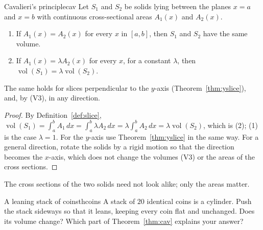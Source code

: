 \documentclass[11pt]{article}
\begin{document}
\begin{thm}{Cavalieri's principle}{cav}
Let $S_1$ and $S_2$ be solids lying between the planes $x=a$ and $x=b$ with continuous cross-sectional areas $A_1(x)$ and $A_2(x)$.
\begin{enumerate}[label=(\arabic*),nosep]
  \item If $A_1(x)=A_2(x)$ for every $x$ in $[a,b]$, then $S_1$ and $S_2$ have the same volume.
  \item If $A_1(x)=\lambda A_2(x)$ for every $x$, for a constant $\lambda$, then $\operatorname{vol}(S_1)=\lambda\operatorname{vol}(S_2)$.
\end{enumerate}
The same holds for slices perpendicular to the $y$-axis (Theorem~\ref{thm:yslice}), and, by (V3), in any direction.
\end{thm}
\begin{proof}
By Definition~\ref{def:slice}, $\operatorname{vol}(S_1)=\int_a^bA_1\,dx=\int_a^b\lambda A_2\,dx=\lambda\int_a^bA_2\,dx=\lambda\operatorname{vol}(S_2)$, which is (2); (1) is the case $\lambda=1$. For the $y$-axis use Theorem~\ref{thm:yslice} in the same way. For a general direction, rotate the solids by a rigid motion so that the direction becomes the $x$-axis, which does not change the volumes (V3) or the areas of the cross sections.
\end{proof}

The cross sections of the two solids need not look alike; only the areas matter.

\begin{think}{A leaning stack of coins}{thcoins}
A stack of $20$ identical coins is a cylinder. Push the stack sideways so that it leans, keeping every coin flat and unchanged. Does its volume change? Which part of Theorem~\ref{thm:cav} explains your answer?
\end{think}
\end{document}
